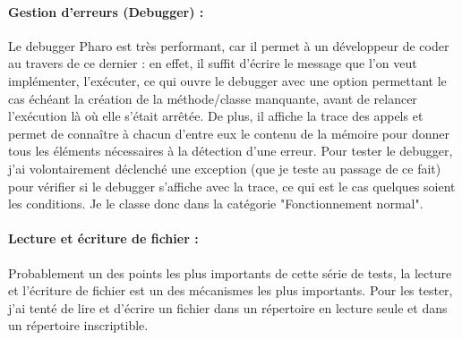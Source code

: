 \paragraph{Gestion d'erreurs (Debugger) :}
Le debugger Pharo est très performant, car il permet à un développeur de coder au travers de ce dernier : en effet, il suffit d'écrire le message que l'on veut implémenter, l'exécuter, ce qui ouvre le debugger avec une option permettant le cas échéant la création de la méthode/classe manquante, avant de relancer l'exécution là où elle s'était arrêtée. De plus, il affiche la trace des appels et permet de connaître à chacun d'entre eux le contenu de la mémoire pour donner tous les éléments nécessaires à la détection d'une erreur.
Pour tester le debugger, j'ai volontairement déclenché une exception (que je teste au passage de ce fait) pour vérifier si le debugger s'affiche avec la trace, ce qui est le cas quelques soient les conditions. Je le classe donc dans la catégorie "Fonctionnement normal".

\paragraph{Lecture et écriture de fichier :}
Probablement un des points les plus importants de cette série de tests, la lecture et l'écriture de fichier est un des mécanismes les plus importants. Pour les tester, j'ai tenté de lire et d'écrire un fichier dans un répertoire en lecture seule et dans un répertoire inscriptible. 








